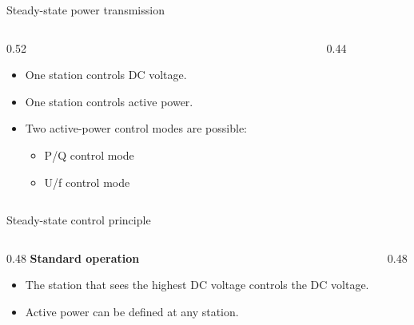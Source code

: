 \begin{frame}{Steady-state power transmission}
  \begin{columns}[c,onlytextwidth]
    \begin{column}{0.52\textwidth}
      \begin{itemize}
        \setlength{\itemsep}{0.4em}
        \item One station controls DC voltage.
        \item One station controls active power.
        \item Two active-power control modes are possible:
          \begin{itemize}
            \item P/Q control mode
            \item U/f control mode
          \end{itemize}
      \end{itemize}
    \end{column}
    \begin{column}{0.44\textwidth}
      \centering
      \\[0.6em]
    \end{column}
  \end{columns}
\end{frame}

\begin{frame}{Steady-state control principle}
  \begin{columns}[T,onlytextwidth]
    \begin{column}{0.48\textwidth}
      \textbf{Standard operation}
      \begin{itemize}
        \setlength{\itemsep}{0.25em}
        \item The station that sees the highest DC voltage controls the DC voltage.
        \item Active power can be defined at any station.
      \end{itemize}
    \end{column}
    \begin{column}{0.48\textwidth}
    \end{column}
  \end{columns}
\end{frame}


